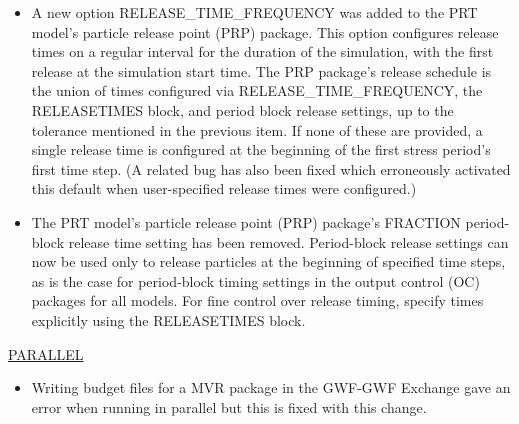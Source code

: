 \begin{itemize}
		\item A new option RELEASE\_TIME\_FREQUENCY was added to the PRT model's particle release point (PRP) package. This option configures release times on a regular interval for the duration of the simulation, with the first release at the simulation start time. The PRP package's release schedule is the union of times configured via RELEASE\_TIME\_FREQUENCY, the RELEASETIMES block, and period block release settings, up to the tolerance mentioned in the previous item. If none of these are provided, a single release time is configured at the beginning of the first stress period's first time step. (A related bug has also been fixed which erroneously activated this default when user-specified release times were configured.)
		\item The PRT model's particle release point (PRP) package's FRACTION period-block release time setting has been removed. Period-block release settings can now be used only to release particles at the beginning of specified time steps, as is the case for period-block timing settings in the output control (OC) packages for all models. For fine control over release timing, specify times explicitly using the RELEASETIMES block.
	\end{itemize}






	\underline{PARALLEL}
	\begin{itemize}
		\item Writing budget files for a MVR package in the GWF-GWF Exchange gave an error when running in parallel but this is fixed with this change.
	\end{itemize}

